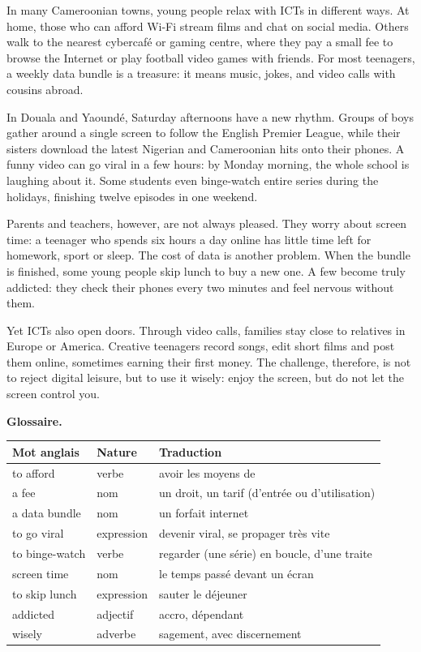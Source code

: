 \documentclass[11pt]{article}
\begin{document}
\begin{textebox}
In many Cameroonian towns, young people relax with ICTs in different ways. At home, those who can afford Wi-Fi stream films and chat on social media. Others walk to the nearest cybercafé or gaming centre, where they pay a small fee to browse the Internet or play football video games with friends. For most teenagers, a weekly data bundle is a treasure: it means music, jokes, and video calls with cousins abroad.

In Douala and Yaoundé, Saturday afternoons have a new rhythm. Groups of boys gather around a single screen to follow the English Premier League, while their sisters download the latest Nigerian and Cameroonian hits onto their phones. A funny video can go viral in a few hours: by Monday morning, the whole school is laughing about it. Some students even binge-watch entire series during the holidays, finishing twelve episodes in one weekend.

Parents and teachers, however, are not always pleased. They worry about screen time: a teenager who spends six hours a day online has little time left for homework, sport or sleep. The cost of data is another problem. When the bundle is finished, some young people skip lunch to buy a new one. A few become truly addicted: they check their phones every two minutes and feel nervous without them.

Yet ICTs also open doors. Through video calls, families stay close to relatives in Europe or America. Creative teenagers record songs, edit short films and post them online, sometimes earning their first money. The challenge, therefore, is not to reject digital leisure, but to use it wisely: enjoy the screen, but do not let the screen control you.
\end{textebox}

\textbf{Glossaire.}

\begin{center}
\begin{tabularx}{\linewidth}{|l|l|X|}
\hline
\rowcolor{popblueL} \textbf{Mot anglais} & \textbf{Nature} & \textbf{Traduction} \\
\hline
to afford & verbe & avoir les moyens de \\
\hline
a fee & nom & un droit, un tarif (d'entrée ou d'utilisation) \\
\hline
a data bundle & nom & un forfait internet \\
\hline
to go viral & expression & devenir viral, se propager très vite \\
\hline
to binge-watch & verbe & regarder (une série) en boucle, d'une traite \\
\hline
screen time & nom & le temps passé devant un écran \\
\hline
to skip lunch & expression & sauter le déjeuner \\
\hline
addicted & adjectif & accro, dépendant \\
\hline
wisely & adverbe & sagement, avec discernement \\
\hline
\end{tabularx}
\end{center}
\end{document}
